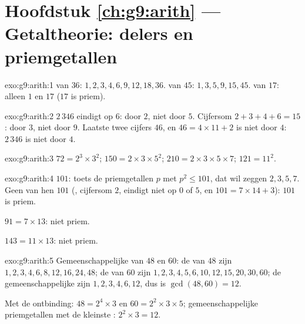 \section*{Hoofdstuk \ref{ch:g9:arith} --- Getaltheorie: delers en priemgetallen}

\begin{solution}{exo:g9:arith:1}
 van $36$: $1, 2, 3, 4, 6, 9, 12, 18, 36$.
 van $45$: $1, 3, 5, 9, 15, 45$.
 van $17$: alleen $1$ en $17$ ($17$ is priem).
\end{solution}

\begin{solution}{exo:g9:arith:2}
$2\,346$ eindigt op $6$:  door $2$, niet door $5$. Cijfersom
$2 + 3 + 4 + 6 = 15$:  door $3$, niet door $9$. Laatste twee cijfers
$46$, en $46 = 4 \times 11 + 2$ is niet  door $4$: $2\,346$ is niet
 door $4$.
\end{solution}

\begin{solution}{exo:g9:arith:3}
$72 = 2^3 \times 3^2$; \quad
$150 = 2 \times 3 \times 5^2$; \quad
$210 = 2 \times 3 \times 5 \times 7$; \quad
$121 = 11^2$.
\end{solution}

\begin{solution}{exo:g9:arith:4}
$101$: toets de priemgetallen $p$ met $p^2 \leq 101$, dat wil zeggen
$2, 3, 5, 7$. Geen van hen  $101$ (, cijfersom $2$, eindigt niet op
$0$ of $5$, en $101 = 7 \times 14 + 3$): $101$ is priem.

$91 = 7 \times 13$: niet priem.

$143 = 11 \times 13$: niet priem.
\end{solution}

\begin{solution}{exo:g9:arith:5}
Gemeenschappelijke  van $48$ en $60$: de  van $48$ zijn
$1, 2, 3, 4, 6, 8, 12, 16, 24, 48$; de  van $60$ zijn
$1, 2, 3, 4, 5, 6, 10, 12, 15, 20, 30, 60$; de gemeenschappelijke zijn
$1, 2, 3, 4, 6, 12$, dus is $\gcd(48,60) = 12$.

Met de ontbinding: $48 = 2^4 \times 3$ en $60 = 2^2 \times 3 \times 5$;
gemeenschappelijke priemgetallen met de kleinste :
$2^2 \times 3 = 12$.
\end{solution}

